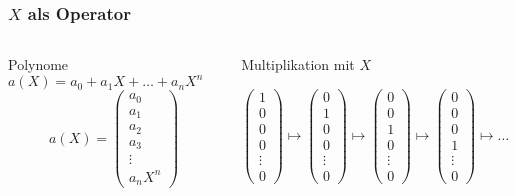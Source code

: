%
%
%
\begin{frame}[t]
\frametitle{$X$ als Operator}
\begin{columns}[t,onlytextwidth]
\begin{column}{0.38\textwidth}
\begin{block}{Polynome}
$a(X)=a_0+a_1X+\dots+a_nX^n$
\[
a(X)
=
\begin{pmatrix}
a_0\\a_1\\a_2\\a_3\\\vdots\\a_nX^n
\end{pmatrix}
\]
\end{block}
\end{column}
\begin{column}{0.58\textwidth}
\begin{block}{Multiplikation mit $X$}
\strut
\[
\begin{pmatrix}
1\\0\\0\\0\\\vdots\\0
\end{pmatrix}
\mapsto
\begin{pmatrix}
0\\1\\0\\0\\\vdots\\0
\end{pmatrix}
\mapsto
\begin{pmatrix}
0\\0\\1\\0\\\vdots\\0
\end{pmatrix}
\mapsto
\begin{pmatrix}
0\\0\\0\\1\\\vdots\\0
\end{pmatrix}
\mapsto\dots\mapsto
\begin{pmatrix}
0\\0\\0\\0\\\vdots\\1
\end{pmatrix}
\]
\end{block}
\end{column}
\end{columns}
\end{frame}
